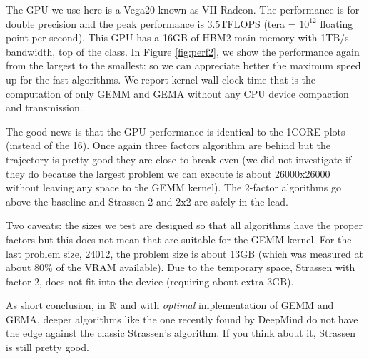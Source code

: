 \documentclass[acmsmall]{acmart}
\begin{document}


The GPU we use here is a Vega20 known as VII Radeon. The performance
is for double precision and the peak performance is 3.5TFLOPS (tera =
$10^{12}$ floating point per second). This GPU has a 16GB of HBM2 main
memory with 1TB/s bandwidth, top of the class.  In Figure
\ref{fig:perf2}, we show the performance again from the largest to the
smallest: so we can appreciate better the maximum speed up for the
fast algorithms. We report kernel wall clock time that is the
computation of only GEMM and GEMA without any CPU device compaction
and transmission.


The good news is that the GPU performance is identical to the 1CORE
plots (instead of the 16). Once again three factors algorithm are
behind but the trajectory is pretty good they are close to break even
(we did not investigate if they do because the largest problem we can
execute is about 26000x26000 without leaving any space to the GEMM
kernel). The 2-factor algorithms go above the baseline and Strassen 2
and 2x2 are safely in the lead.


Two caveats: the sizes we test are designed so that all algorithms
have the proper factors but this does not mean that are suitable for
the GEMM kernel. For the last problem size, 24012, the problem size is
about 13GB (which was measured at about 80\% of the VRAM
available). Due to the temporary space, Strassen with factor 2, does
not fit into the device (requiring about extra 3GB).

As short conclusion, in $\mathbb{R}$ and with {\em optimal} implementation of
GEMM and GEMA, deeper algorithms like the one recently found by
DeepMind do not have the edge against the classic Strassen's
algorithm. If you think about it, Strassen is still pretty good.


  







%

 

%
\end{document}
